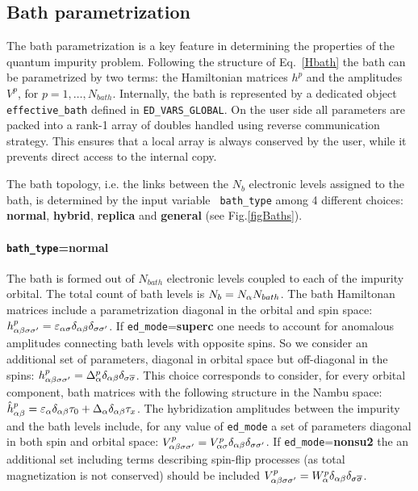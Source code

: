 \documentclass[edipack2.tex]{subfiles}
\begin{document}
\subsection{Bath parametrization}\label{sSecBath}
The bath parametrization is a key feature in determining the properties
of the quantum impurity problem.
Following the structure of Eq.~\ref{Hbath} the bath can be
parametrized by two terms: the Hamiltonian matrices $h^p$ and the
amplitudes $V^p$, for $p=1,\dots,N_{bath}$.
Internally, the bath is represented by a dedicated object {\tt
  effective\_bath} defined in {\tt ED\_VARS\_GLOBAL}. 
On the
user side all parameters are packed into a rank-1 array of
doubles handled using reverse communication strategy.
This ensures that a local array is always conserved by the user, while
it prevents direct access to the internal copy.


The bath topology, i.e. the links between the $N_b$ electronic levels
assigned to the bath, is determined by the input variable {\tt
  bath\_type} among 4 different choices: {\bf normal}, {\bf hybrid},
{\bf replica} and {\bf general} (see Fig.\ref{figBaths}).  
%
\paragraph{{\tt bath\_type}={\bf normal}} The bath is formed out of $N_{bath}$
electronic levels coupled to each of the impurity orbital. The total
count of bath levels is $N_b = N_\alpha N_{bath}$. The bath Hamiltonan
matrices include a parametrization diagonal in the orbital and spin space: 
$h^p_{\alpha\beta\sigma\sigma'}=\varepsilon_{\alpha\sigma}\delta_{\alpha\beta}\delta_{\sigma\sigma'}$.
If {\tt ed\_mode}={\bf superc} one needs to account for anomalous
amplitudes connecting bath levels with opposite spins. So we consider
an additional set of parameters, diagonal in orbital space but
off-diagonal in the spins:
$h^p_{\alpha\beta\sigma\sigma'}=\Delta^p_{\alpha}\delta_{\alpha\beta}\delta_{\sigma \overline{\sigma}}$.
This choice corresponds to consider, for every orbital component,
bath matrices with the following structure in the Nambu space:
$\hat{h}^p_{\alpha\beta} = \varepsilon_{\alpha}\delta_{\alpha\beta}\tau_0 +
\Delta_{\alpha}\delta_{\alpha\beta}\tau_x$. 
The hybridization amplitudes between the impurity and the bath levels
include, for any value of {\tt ed\_mode} a set of parameters diagonal in both
spin and orbital space: $V^p_{\alpha\beta\sigma\sigma'}=V^p_{\alpha\sigma}\delta_{\alpha\beta}\delta_{\sigma\sigma'}$.
If {\tt ed\_mode}={\bf nonsu2} the an additional set including terms
describing spin-flip processes (as total magnetization is not
conserved) should be included $V^p_{\alpha\beta\sigma\sigma'} =
W^p_{\alpha}\delta_{\alpha\beta}\delta_{\sigma \overline{\sigma}}$. 
\end{document}
